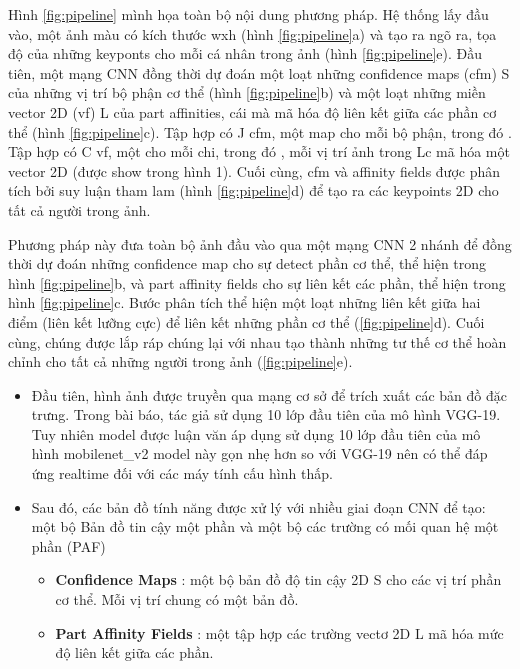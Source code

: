 Hình \ref{fig:pipeline} mình họa toàn bộ nội dung phương pháp. Hệ thống lấy đầu vào, một ảnh màu có kích thước wxh (hình \ref{fig:pipeline}a) và tạo ra ngõ ra, tọa độ của những keyponts cho mỗi cá nhân trong ảnh (hình \ref{fig:pipeline}e). Đầu tiên, một mạng CNN đồng thời dự đoán một loạt những confidence maps (cfm) S của những vị trí bộ phận cơ thể (hình \ref{fig:pipeline}b) và một loạt những miền vector 2D (vf) L của part affinities, cái mà mã hóa độ liên kết giữa các phần cơ thể (hình \ref{fig:pipeline}c). Tập hợp  có J cfm, một map cho mỗi bộ phận, trong đó . Tập hợp  có C vf, một cho mỗi chi, trong đó , mỗi vị trí ảnh trong Lc mã hóa một vector 2D (được show trong hình 1). Cuối cùng, cfm và affinity fields được phân tích bởi suy luận tham lam (hình \ref{fig:pipeline}d) để tạo ra các keypoints 2D cho tất cả người trong ảnh.

Phương pháp này đưa toàn bộ ảnh đầu vào qua một mạng CNN 2 nhánh để đồng thời dự đoán những confidence map cho sự detect phần cơ thể, thể hiện trong hình \ref{fig:pipeline}b, và part affinity fields cho sự liên kết các phần, thể hiện trong hình \ref{fig:pipeline}c. Bước phân tích thể hiện một loạt những liên kết giữa hai điểm (liên kết lưỡng cực) để liên kết những phần cơ thể (\ref{fig:pipeline}d). Cuối cùng, chúng được lắp ráp chúng lại với nhau tạo thành những tư thế cơ thể hoàn chỉnh cho tất cả những người trong ảnh (\ref{fig:pipeline}e).

\begin{itemize} %
\item Đầu tiên, hình ảnh được truyền qua mạng cơ sở để trích xuất các bản đồ đặc trưng. Trong bài báo, tác giả sử dụng 10 lớp đầu tiên của mô hình VGG-19. Tuy nhiên model được luận văn áp dụng sử dụng 10 lớp đầu tiên của mô hình mobilenet\_v2 model này gọn nhẹ hơn so với VGG-19 nên có thể đáp ứng realtime đối với các máy tính cấu hình thấp.
\end{itemize}


\begin{itemize} %
\item Sau đó, các bản đồ tính năng được xử lý với nhiều giai đoạn CNN để tạo: một bộ Bản đồ tin cậy một phần và một bộ các trường có mối quan hệ một phần (PAF)
	\begin{itemize}
	\item \textbf{Confidence Maps} : một bộ bản đồ độ tin cậy 2D S cho các vị trí phần cơ thể. Mỗi vị trí chung có một bản đồ.
	\item \textbf{Part Affinity Fields} : một tập hợp các trường vectơ 2D L mã hóa mức độ liên kết giữa các phần.
	\end{itemize}
\end{itemize}


